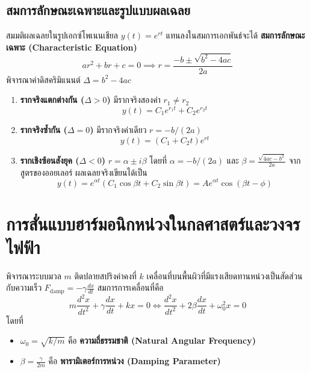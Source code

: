 \subsection{สมการลักษณะเฉพาะและรูปแบบผลเฉลย}
สมมติผลเฉลยในรูปเอกซ์โพเนนเชียล $y(t) = e^{rt}$ แทนลงในสมการเอกพันธ์จะได้ \textbf{สมการลักษณะเฉพาะ (Characteristic Equation)}
\begin{equation}
ar^2 + br + c = 0 \implies r = \frac{-b \pm \sqrt{b^2 - 4ac}}{2a}
\end{equation}
พิจารณาค่าดิสคริมิแนนต์ $\Delta = b^2 - 4ac$
\begin{enumerate}
    \item \textbf{รากจริงแตกต่างกัน ($\Delta > 0$)} มีรากจริงสองค่า $r_1 \neq r_2$
    \begin{equation}
    y(t) = C_1 e^{r_1 t} + C_2 e^{r_2 t}
    \end{equation}
    \item \textbf{รากจริงซ้ำกัน ($\Delta = 0$)} มีรากจริงค่าเดียว $r = -b/(2a)$
    \begin{equation}
    y(t) = (C_1 + C_2 t) e^{rt}
    \end{equation}
    \item \textbf{รากเชิงซ้อนสังยุค ($\Delta < 0$)} $r = \alpha \pm i\beta$ โดยที่ $\alpha = -b/(2a)$ และ $\beta = \frac{\sqrt{4ac - b^2}}{2a}$ จากสูตรของออยเลอร์ ผลเฉลยจริงเขียนได้เป็น
    \begin{equation}
    y(t) = e^{\alpha t}\left(C_1 \cos\beta t + C_2 \sin\beta t\right) = A e^{\alpha t}\cos(\beta t - \phi)
    \end{equation}
\end{enumerate}

\section{การสั่นแบบฮาร์มอนิกหน่วงในกลศาสตร์และวงจรไฟฟ้า}
พิจารณาระบบมวล $m$ ติดปลายสปริงค่าคงที่ $k$ เคลื่อนที่บนพื้นผิวที่มีแรงเสียดทานหน่วงเป็นสัดส่วนกับความเร็ว $F_{\text{damp}} = -\gamma \frac{dx}{dt}$ สมการการเคลื่อนที่คือ
\begin{equation}
m\frac{d^2x}{dt^2} + \gamma\frac{dx}{dt} + kx = 0 \iff \frac{d^2x}{dt^2} + 2\beta\frac{dx}{dt} + \omega_0^2 x = 0
\end{equation}
โดยที่
\begin{itemize}
    \item $\omega_0 = \sqrt{k/m}$ คือ \textbf{ความถี่ธรรมชาติ (Natural Angular Frequency)}
    \item $\beta = \frac{\gamma}{2m}$ คือ \textbf{พารามิเตอร์การหน่วง (Damping Parameter)}
\end{itemize}

